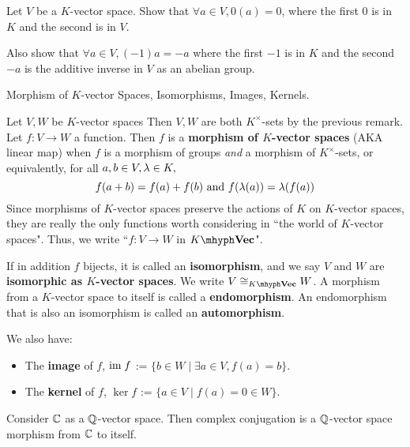 \documentclass[../../book.tex]{subfiles}
\begin{document}
\begin{ex}
    Let $V$ be a $K$-vector space. 
    Show that $\forall a \in V, 0(a) = 0$, 
    where the first 0 is in $K$ and the second is in $V$. 
    
    Also show that $\forall a \in V, (-1)a = -a$
    where the first $-1$ is in $K$ and 
    the second $-a$ is the additive inverse in $V$ as an abelian group.
\end{ex}

\begin{dfn} Morphism of $K$-vector Spaces, Isomorphisms, Images, Kernels. 

    Let $V, W$ be $K$-vector spaces
    Then $V, W$ are both $K^\times$-sets by the previous remark. 
    Let $f : V \to W$ a function. 
    Then $f$ is a \textbf{morphism of $K$-vector spaces} (AKA linear map) when 
    $f$ is a morphism of groups \emph{and} a morphism of $K^\times$-sets, 
    or equivalently, for all $a, b \in V, \lambda \in K,$ 
    \[
        f(a + b) = f(a) + f(b) \text{ and } 
        f(\lambda(a)) = \lambda(f(a))
    \]
    Since morphisms of $K$-vector spaces preserve 
    the actions of $K$ on $K$-vector spaces, 
    they are really the only functions worth considering 
    in ``the world of $K$-vector spaces". 
    Thus, we write ``$f : V \to W$ in $\KVec$". 
    
    If in addition $f$ bijects, it is called an \textbf{isomorphism}, and 
    we say $V$ and $W$ are \textbf{isomorphic as $K$-vector spaces}.
    We write $V \iso_{\KVec} W$.
    A morphism from a $K$-vector space to itself is called a \textbf{endomorphism}.
    An endomorphism that is also an isomorphism is called an \textbf{automorphism}. 
    
    We also have: 
    \begin{itemize}
        \item The \textbf{image} of $f$, 
            $\textnormal{im}\; f$ := $\{b \in W \mid \exists a \in V, f(a) = b\}$.
        \item The \textbf{kernel} of $f$, 
            $ \ker f$ := $\{ a \in V \mid f(a) = 0 \in W\}$.
    \end{itemize}
\end{dfn}
\begin{eg}
    
    Consider $\mathbb{C}$ as a $\mathbb{Q}$-vector space.
    Then complex conjugation is a $\mathbb{Q}$-vector space morphism from $\mathbb{C}$ to itself.
    
\end{eg}
\end{document}
